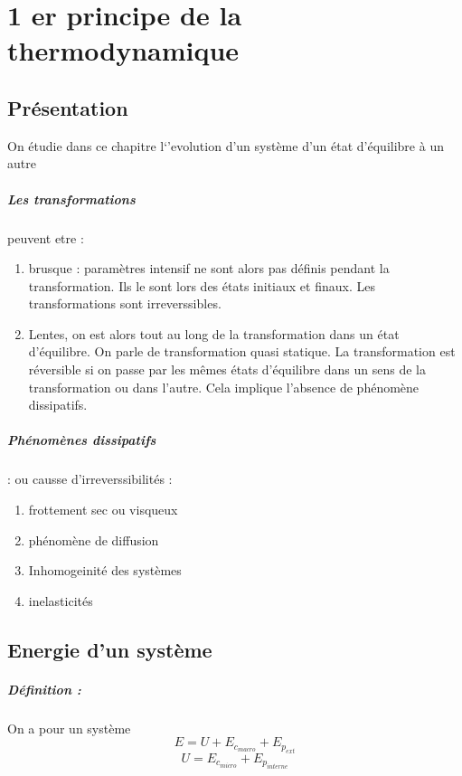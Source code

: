 \documentclass[a4paper,10pt]{report}
\begin{document}
\chapter{1 er principe de la thermodynamique}
\section{Présentation}
On étudie dans ce chapitre l`'evolution d'un système d'un état d'équilibre à un autre

\paragraph{Les transformations} peuvent etre :
\begin{enumerate}
 \item brusque : paramètres intensif ne sont alors pas définis pendant la transformation. Ils le sont lors des états initiaux et finaux.
 Les transformations sont irreverssibles.
 \item Lentes, on est alors tout au long de la transformation dans un état d'équilibre. On parle de transformation quasi statique.
 La transformation est réversible si on passe par les mêmes états d'équilibre dans un sens de la transformation ou dans l'autre. Cela implique
 l'absence de phénomène dissipatifs.
\end{enumerate}
\paragraph{Phénomènes dissipatifs}: ou causse d'irreverssibilités :
\begin{enumerate}
 \item frottement sec ou visqueux
 \item phénomène de diffusion
 \item Inhomogeinité des systèmes
 \item inelasticités
\end{enumerate}

\section{Energie d'un système}
\paragraph{Définition :}On a pour un système
\begin{equation}
 E = U + E_{c_{macro}} + E_{p_{ext}}
\end{equation}
\begin{equation}
 U = E_{c_{micro}} + E_{p_{interne}}
\end{equation}
\end{document}
